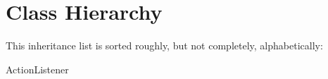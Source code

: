 \section{Class Hierarchy}
This inheritance list is sorted roughly, but not completely, alphabetically\+:\begin{DoxyCompactList}
\item Action\+Listener\begin{DoxyCompactList}
\item {}
\end{DoxyCompactList}
\end{DoxyCompactList}
